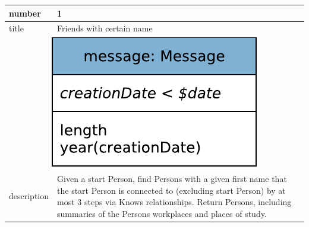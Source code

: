\renewcommand*{\arraystretch}{1.1}

\noindent\begin{tabularx}{17cm}{|p{1.95cm}|X|}
	\hline
	number      & 1                                                          \\ \hline
%
	title       & Friends with certain name                                                           \\ \hline
	\multicolumn{2}{|c|}{ \includegraphics[scale=\patternscale,margin=0cm .2cm]{patterns/q01}} \\ \hline
	description & Given a start Person, find Persons with a given first name that the
start Person is connected to (excluding start Person) by at most 3 steps
via Knows relationships. Return Persons, including summaries of the
Persons workplaces and places of study.
 \\ \hline
	

\end{tabularx}
